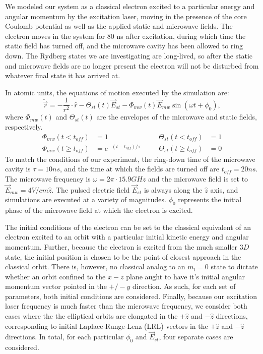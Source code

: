 \documentclass[aps,pra,preprint,groupedaddress]{revtex4-1}
\begin{document}
We modeled our system as a classical electron excited to a particular energy and angular momentum by the excitation laser, moving in the presence of the core Coulomb potential as well as the applied static and microwave fields. The electron moves in the system for 80 ns after excitation, during which time the static field has turned off, and the microwave cavity has been allowed to ring down. The Rydberg states we are investigating are long-lived, so after the static and microwave fields are no longer present the electron will not be disturbed from whatever final state it has arrived at.

In atomic units, the equations of motion executed by the simulation are:
\begin{equation}
\ddot{\vec{r}} = -\frac{1}{r^2} \cdot \hat{r} - \Theta_{st}(t) \vec{E}_{st} - \Phi_{mw}(t) \vec{E}_{mw} \sin{(\omega t + \phi_0)},
\end{equation}
where $\Phi_{mw}(t)$ and $\Theta_{st}(t)$ are the envelopes of the microwave and static fields, respectively.
\begin{align}
\Phi_{mw}(t<t_{off}) & = 1 & \quad & \Theta_{st}(t<t_{off}) & = 1 \\
\Phi_{mw}(t \geq t_{off}) & = e^{-(t-t_{off})/\tau} & \quad & \Theta_{st}(t \geq t_{off}) & = 0
\end{align}
To match the conditions of our experiment, the ring-down time of the microwave cavity is $\tau = 10 ns$, and the time at which the fields are turned off are $t_{off} = 20 ns$. The microwave frequency is $\omega = 2\pi \cdot 15.9 GHz$ and the microwave field is set to $\vec{E}_{mw} = 4 V/cm \hat{z}$. The pulsed electric field $\vec{E}_{st}$ is always along the $\hat{z}$ axis, and simulations are executed at a variety of magnitudes. $\phi_0$ represents the initial phase of the microwave field at which the electron is excited.

The initial conditions of the electron can be set to the classical equivalent of an electron excited to an orbit with a particular initial kinetic energy and angular momentum. Further, because the electron is excited from the much smaller $3D$ state, the initial position is chosen to be the point of closest approach in the classical orbit. There is, however, no classical analog to an $m_l = 0$ state to dictate whether an orbit confined to the $x-z$ plane aught to have it's initial angular momentum vector pointed in the $+/- \hat{y}$ direction. As such, for each set of parameters, both initial conditions are considered. Finally, because our excitation laser frequency is much faster than the microwave frequency, we consider both cases where the the elliptical orbits are elongated in the $+ \hat{z}$ and $-\hat{z}$ directions, corresponding to initial Laplace-Runge-Lenz (LRL) vectors in the $+\hat{z}$ and $-\hat{z}$ directions. In total, for each particular $\phi_0$ and $\vec{E}_{st}$, four separate cases are considered.
\end{document}
